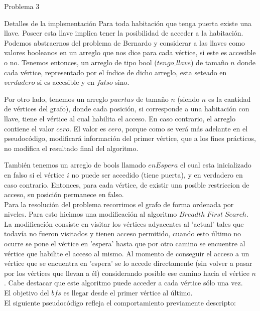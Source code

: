 \begin{section}{Problema 3}
\begin{subsection}{Detalles de la implementación}
		Para toda habitación que tenga puerta existe una llave. Poseer esta llave implica tener la posibilidad de acceder a la habitación. Podemos abstraernos del problema de Bernardo y considerar a las llaves como valores booleanos en un arreglo que nos dice para cada vértice, si este es accesible o no. Tenemos entonces, un arreglo de tipo bool ($tengo\_llave$) de tamaño $n$ donde cada vértice, representado por el índice de dicho arreglo, esta seteado en $verdadero$ si es accesible y en $falso$ sino.

		Por otro lado, tenemos un arreglo $puertas$ de tamaño $n$ (siendo $n$ es la cantidad de vértices del grafo), donde cada posición, si corresponde a una habitación con llave, tiene el vértice al cual habilita el acceso. En caso contrario, el arreglo contiene el valor $cero$. El valor es $cero$, porque como se verá más adelante en el pseudocódigo, modificará información del primer vértice, que a los fines prácticos, no modifica el resultado final del algoritmo.
		
		También tenemos un arreglo de bools llamado $enEspera$ el cual esta inicializado en falso si el vértice $i$ no puede ser accedido (tiene puerta), y en verdadero en caso contrario. Entonces, para cada vértice, de existir una posible restriccion de acceso, su posición permanece en falso.\\

		Para la resolución del problema recorrimos el grafo de forma ordenada por niveles. Para esto hicimos una modificación al algoritmo $Breadth\; First\; Search$. La modificación consiste en visitar los vértices adyacentes al 'actual' tales que todavía no fueron visitados y tienen acceso permitido, cuando esto último no ocurre se pone el vértice en 'espera' hasta que por otro camino se encuentre al vértice que habilite el acceso al mismo. Al momento de conseguir el acceso a un vértice que se encuentra en 'espera' se lo accede directamente (sin volver a pasar por los vértices que llevan a él) considerando posible ese camino hacia el vértice $n$. Cabe destacar que este algoritmo puede acceder a cada vértice sólo una vez.\\ 

		El objetivo del $bfs$ es llegar desde el primer vértice al último.\\
		
		El siguiente pseudocódigo refleja el comportamiento previamente descripto:\\


\end{subsection}
\end{section}
